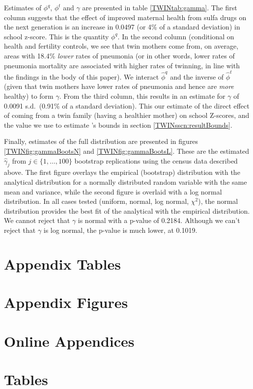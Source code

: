 \documentclass[subeqn]{article}
\begin{document}
\begin{spacing}{1.4}
Estimates of $\phi^q$, $\phi^t$ and $\gamma$ are presented in table 
\ref{TWINtab:gamma}.  The first column suggests that the effect of improved
maternal health from sulfa drugs on the next generation is an increase
in 0.0497 (or 4\% of a standard deviation) in school z-score.  This is the
quantity $\phi^q$.  In the second column (conditional on health and fertility
controls, we see that twin mothers come from, on average, areas with 18.4\%
\emph{lower} rates of pneumonia (or in other words, lower rates of pneumonia
mortality are associated with higher rates of twinning, in line with the
findings in the body of this paper).  We interact $\hat\phi^q$ and the inverse
of $\hat\phi^t$ (given that twin mothers have lower rates of pneumonia and
hence are \emph{more} healthy) to form $\gamma$.  From the third column, this
results in an estimate for $\gamma$ of 0.0091 s.d.\ (0.91\% of a standard
deviation).  This our estimate of the direct effect of coming from a twin
family (having a healthier mother) on school Z-scores, and the value we use
to estimate \citet{Conleyetal2012}'s bounds in section 
\ref{TWINsscn:resultBounds}.

Finally, estimates of the full distribution are presented in figures 
\ref{TWINfig:gammaBootsN} and \ref{TWINfig:gammaBootsL}.  These are
the estimated $\hat\gamma_j$ from $j \in \{1,\ldots,100\}$ bootstrap 
replications using the census data described above.  The first figure 
overlays the empirical (bootstrap) distribution with the analytical 
distribution for a normally distributed random variable with the same mean 
and variance, while the second figure is overlaid with a log normal 
distribution.  In all cases tested (uniform, normal, log normal, $\chi^2$), 
the normal distribution provides the best fit of the analytical with the 
empirical distribution. We cannot reject that $\gamma$ is normal with a 
p-value of 0.2184.  Although we can't reject that $\gamma$ is log normal, 
the p-value is much lower, at 0.1019.

\newpage
\end{spacing}

\section{Appendix Tables}

\clearpage
\newpage

\section{Appendix Figures}


\appendix
\section*{Online Appendices}
\section{Tables}

\end{document}
